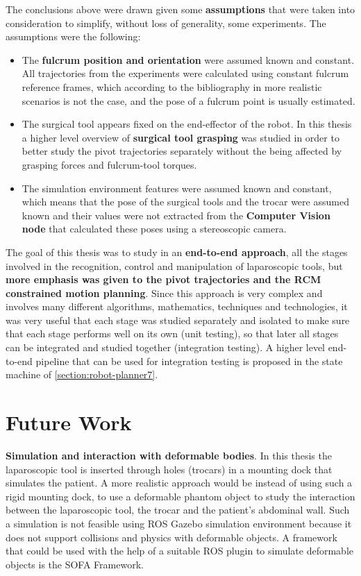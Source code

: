 The conclusions above were drawn given some \textbf{assumptions} that were taken into consideration to simplify, without loss of generality, some experiments. The assumptions were the following:
\begin{itemize}
\item The \textbf{fulcrum position and orientation} were assumed known and constant. All trajectories from the experiments were calculated using constant fulcrum reference frames, which according to the bibliography in more 
realistic scenarios is not the case, and the pose of a fulcrum point is usually estimated.
\item The surgical tool appears fixed on the end-effector of the robot. In this thesis a higher level overview of \textbf{surgical tool grasping} was studied in order to better study the pivot trajectories separately without 
the being affected by grasping forces and fulcrum-tool torques.
\item The simulation environment features were assumed known and constant, which means that the pose of the surgical tools and the trocar were assumed known and their values were not extracted from the \textbf{Computer Vision 
node} that calculated these poses using a stereoscopic camera.
\end{itemize}

The goal of this thesis was to study in an \textbf{end-to-end approach}, all the stages involved in the recognition, control and manipulation of laparoscopic tools, but \textbf{more emphasis was given to the pivot 
trajectories and the RCM constrained motion planning}. Since this approach is very complex and involves many different algorithms, mathematics, techniques and technologies, it was very useful that each stage was studied 
separately and isolated to make sure that each stage performs well on its own (unit testing), so that later all stages can be integrated and studied together (integration testing). A higher level end-to-end pipeline that can 
be used for integration testing is proposed in the state machine of \ref{section:robot-planner7}. \\




\section{Future Work}

\textbf{Simulation and interaction with deformable bodies}. 
In this thesis the laparoscopic tool is inserted through holes (trocars) in a mounting dock that simulates the patient. A more realistic approach would be instead of using such a rigid mounting dock, to use a deformable 
phantom object to study the interaction between the laparoscopic tool, the trocar and the patient's abdominal wall. Such a simulation is not feasible using ROS Gazebo simulation environment because it does not support 
collisions and physics with deformable objects. A framework that could be used with the help of a suitable ROS plugin to simulate deformable objects is the SOFA Framework.

